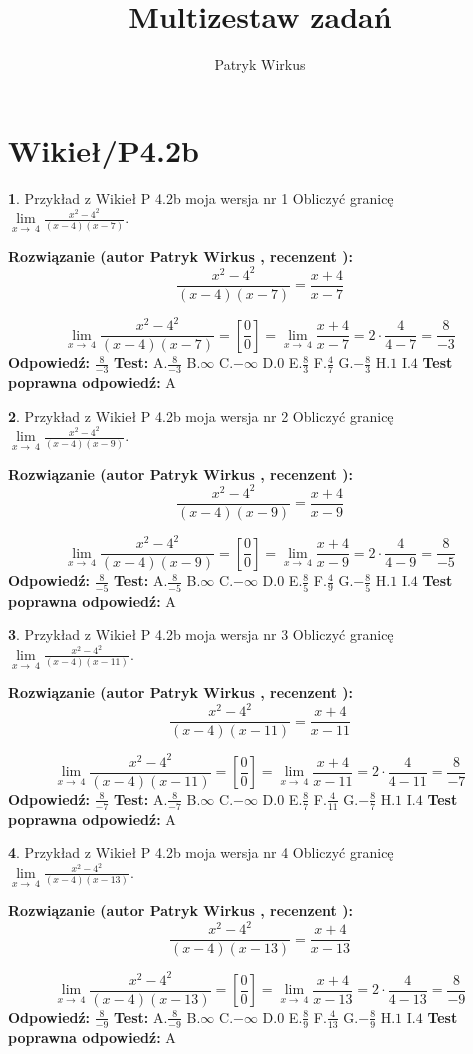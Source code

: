 \documentclass[12pt, a4paper]{article}
\title{Multizestaw zadań}
\author{Patryk Wirkus}
\date{}
\theoremstyle{definition} %
\newtheorem{zad}{}
\newcommand{\kategoria}[1]{\section{#1}}
\newcommand{\zadStart}[1]{\begin{zad}#1\newline}
\newcommand{\zadStop}{\end{zad}}
\newcommand{\rozwStart}[2]{\noindent \textbf{Rozwiązanie (autor #1 , recenzent #2): }\newline}
\newcommand{\rozwStop}{\newline}
\newcommand{\odpStart}{\noindent \textbf{Odpowiedź:}\newline}
\newcommand{\odpStop}{\newline}
\newcommand{\testStart}{\noindent \textbf{Test:}\newline}
\newcommand{\testStop}{\newline}
\newcommand{\kluczStart}{\noindent \textbf{Test poprawna odpowiedź:}\newline}
\newcommand{\kluczStop}{\newline}
\begin{document}
\maketitle

\kategoria{Wikieł/P4.2b}


\zadStart{Przykład z Wikieł P 4.2b moja wersja nr 1}
Obliczyć granicę $\lim\limits_{x\to\ 4}\frac{x^{2}-4^{2}}{(x-4)(x-7)}$.
\zadStop
\rozwStart{Patryk Wirkus}{}
$$\frac{x^{2}-4^{2}}{(x-4)(x-7)}=\frac{x+4}{x-7}$$

$$\lim\limits_{x\to\ 4}\frac{x^{2}-4^{2}}{(x-4)(x-7)}=[\frac{0}{0}]=\lim\limits_{x\to\ 4}\frac{x+4}{x-7}=2 \cdot \frac{4}{4-7} = \frac{8}{-3}$$
\rozwStop
\odpStart
$\frac{8}{-3}$
\odpStop
\testStart
A.$\frac{8}{-3}$
B.$\infty$
C.$-\infty$
D.$0$
E.$\frac{8}{3}$
F.$\frac{4}{7}$
G.$-\frac{8}{3}$
H.$1$
I.$4$
\testStop
\kluczStart
A
\kluczStop



\zadStart{Przykład z Wikieł P 4.2b moja wersja nr 2}
Obliczyć granicę $\lim\limits_{x\to\ 4}\frac{x^{2}-4^{2}}{(x-4)(x-9)}$.
\zadStop
\rozwStart{Patryk Wirkus}{}
$$\frac{x^{2}-4^{2}}{(x-4)(x-9)}=\frac{x+4}{x-9}$$

$$\lim\limits_{x\to\ 4}\frac{x^{2}-4^{2}}{(x-4)(x-9)}=[\frac{0}{0}]=\lim\limits_{x\to\ 4}\frac{x+4}{x-9}=2 \cdot \frac{4}{4-9} = \frac{8}{-5}$$
\rozwStop
\odpStart
$\frac{8}{-5}$
\odpStop
\testStart
A.$\frac{8}{-5}$
B.$\infty$
C.$-\infty$
D.$0$
E.$\frac{8}{5}$
F.$\frac{4}{9}$
G.$-\frac{8}{5}$
H.$1$
I.$4$
\testStop
\kluczStart
A
\kluczStop



\zadStart{Przykład z Wikieł P 4.2b moja wersja nr 3}
Obliczyć granicę $\lim\limits_{x\to\ 4}\frac{x^{2}-4^{2}}{(x-4)(x-11)}$.
\zadStop
\rozwStart{Patryk Wirkus}{}
$$\frac{x^{2}-4^{2}}{(x-4)(x-11)}=\frac{x+4}{x-11}$$

$$\lim\limits_{x\to\ 4}\frac{x^{2}-4^{2}}{(x-4)(x-11)}=[\frac{0}{0}]=\lim\limits_{x\to\ 4}\frac{x+4}{x-11}=2 \cdot \frac{4}{4-11} = \frac{8}{-7}$$
\rozwStop
\odpStart
$\frac{8}{-7}$
\odpStop
\testStart
A.$\frac{8}{-7}$
B.$\infty$
C.$-\infty$
D.$0$
E.$\frac{8}{7}$
F.$\frac{4}{11}$
G.$-\frac{8}{7}$
H.$1$
I.$4$
\testStop
\kluczStart
A
\kluczStop



\zadStart{Przykład z Wikieł P 4.2b moja wersja nr 4}
Obliczyć granicę $\lim\limits_{x\to\ 4}\frac{x^{2}-4^{2}}{(x-4)(x-13)}$.
\zadStop
\rozwStart{Patryk Wirkus}{}
$$\frac{x^{2}-4^{2}}{(x-4)(x-13)}=\frac{x+4}{x-13}$$

$$\lim\limits_{x\to\ 4}\frac{x^{2}-4^{2}}{(x-4)(x-13)}=[\frac{0}{0}]=\lim\limits_{x\to\ 4}\frac{x+4}{x-13}=2 \cdot \frac{4}{4-13} = \frac{8}{-9}$$
\rozwStop
\odpStart
$\frac{8}{-9}$
\odpStop
\testStart
A.$\frac{8}{-9}$
B.$\infty$
C.$-\infty$
D.$0$
E.$\frac{8}{9}$
F.$\frac{4}{13}$
G.$-\frac{8}{9}$
H.$1$
I.$4$
\testStop
\kluczStart
A
\kluczStop
\end{document}
